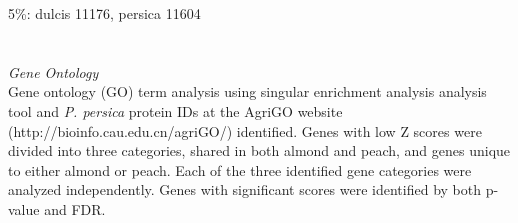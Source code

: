 \documentclass[12pt]{article}
\begin{document}
5\%: dulcis 11176, persica 11604
\\
%
%
%
%
%
\\
%
\\
\emph{Gene Ontology}\\
Gene ontology (GO) term analysis using singular enrichment analysis analysis tool and \emph{P. persica} protein IDs at the AgriGO website (http://bioinfo.cau.edu.cn/agriGO/) identified.
%
Genes with low Z scores were divided into three categories, shared in both almond and peach, and genes unique to either almond or peach. 
%
Each of the three identified gene categories were analyzed independently. 
%
Genes with significant scores were identified by both p-value and FDR.
%
\end{document}
